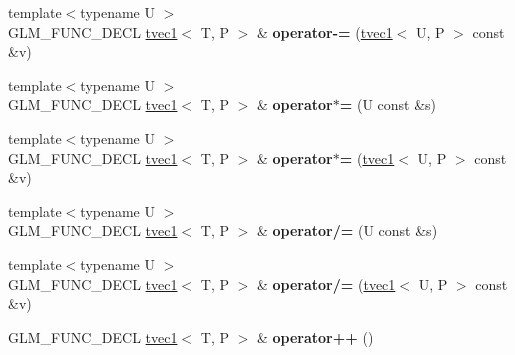 \begin{DoxyCompactItemize}
\item 
\hypertarget{structglm_1_1detail_1_1tvec1_af8992bb613669f1a7aa0ff41a4fd31e3}{{\footnotesize template$<$typename U $>$ }\\G\-L\-M\-\_\-\-F\-U\-N\-C\-\_\-\-D\-E\-C\-L \hyperlink{structglm_1_1detail_1_1tvec1}{tvec1}$<$ T, P $>$ \& {\bfseries operator-\/=} (\hyperlink{structglm_1_1detail_1_1tvec1}{tvec1}$<$ U, P $>$ const \&v)}\label{structglm_1_1detail_1_1tvec1_af8992bb613669f1a7aa0ff41a4fd31e3}

\item 
\hypertarget{structglm_1_1detail_1_1tvec1_a7ca0f64a6ab86fa34d4b5f23a9db58d2}{{\footnotesize template$<$typename U $>$ }\\G\-L\-M\-\_\-\-F\-U\-N\-C\-\_\-\-D\-E\-C\-L \hyperlink{structglm_1_1detail_1_1tvec1}{tvec1}$<$ T, P $>$ \& {\bfseries operator$\ast$=} (U const \&s)}\label{structglm_1_1detail_1_1tvec1_a7ca0f64a6ab86fa34d4b5f23a9db58d2}

\item 
\hypertarget{structglm_1_1detail_1_1tvec1_ada2594a8dd2c0ec4e9a20ec18469668c}{{\footnotesize template$<$typename U $>$ }\\G\-L\-M\-\_\-\-F\-U\-N\-C\-\_\-\-D\-E\-C\-L \hyperlink{structglm_1_1detail_1_1tvec1}{tvec1}$<$ T, P $>$ \& {\bfseries operator$\ast$=} (\hyperlink{structglm_1_1detail_1_1tvec1}{tvec1}$<$ U, P $>$ const \&v)}\label{structglm_1_1detail_1_1tvec1_ada2594a8dd2c0ec4e9a20ec18469668c}

\item 
\hypertarget{structglm_1_1detail_1_1tvec1_aad8c386f7278e9a5685ada9a1a0ef7df}{{\footnotesize template$<$typename U $>$ }\\G\-L\-M\-\_\-\-F\-U\-N\-C\-\_\-\-D\-E\-C\-L \hyperlink{structglm_1_1detail_1_1tvec1}{tvec1}$<$ T, P $>$ \& {\bfseries operator/=} (U const \&s)}\label{structglm_1_1detail_1_1tvec1_aad8c386f7278e9a5685ada9a1a0ef7df}

\item 
\hypertarget{structglm_1_1detail_1_1tvec1_ae74bb46e4d3fd5fdccb1ee6744cbf493}{{\footnotesize template$<$typename U $>$ }\\G\-L\-M\-\_\-\-F\-U\-N\-C\-\_\-\-D\-E\-C\-L \hyperlink{structglm_1_1detail_1_1tvec1}{tvec1}$<$ T, P $>$ \& {\bfseries operator/=} (\hyperlink{structglm_1_1detail_1_1tvec1}{tvec1}$<$ U, P $>$ const \&v)}\label{structglm_1_1detail_1_1tvec1_ae74bb46e4d3fd5fdccb1ee6744cbf493}

\item 
\hypertarget{structglm_1_1detail_1_1tvec1_ae4514c5de0b75209187c80ed65fdd392}{G\-L\-M\-\_\-\-F\-U\-N\-C\-\_\-\-D\-E\-C\-L \hyperlink{structglm_1_1detail_1_1tvec1}{tvec1}$<$ T, P $>$ \& {\bfseries operator++} ()}\label{structglm_1_1detail_1_1tvec1_ae4514c5de0b75209187c80ed65fdd392}


\end{DoxyCompactItemize}
